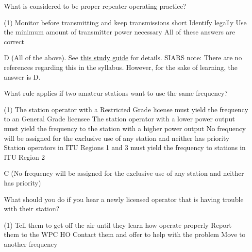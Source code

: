 \documentclass[a4paper]{article}
\begin{document}
\begin{question}What is considered to be proper repeater operating practice?
	\begin{tasks}(1)
		\task Monitor before transmitting and keep transmissions short
		\task Identify legally
		\task Use the minimum amount of transmitter power necessary
		\task All of these answers are correct
	\end{tasks}
\end{question}

\begin{solution}
	D (All of the above). See \href{http://www.smrs.us/classes/he-tech-study.pdf}{this study guide} for details. SIARS note: There are no references regarding this in the syllabus. However, for the sake of learning, the answer is \apostrophe{}D\apostrophe{}.

\end{solution}

\vspace{5mm}



\begin{question}What rule applies if two amateur stations want to use the same frequency?
	\begin{tasks}(1)
		\task The station operator with a Restricted Grade license must yield the frequency to an General Grade licensee
		\task The station operator with a lower power output must yield the frequency to the station with a higher power output
		\task No frequency will be assigned for the exclusive use of any station and neither has priority
		\task Station operators in ITU Regions 1 and 3 must yield the frequency to stations in ITU Region 2
	\end{tasks}
\end{question}

\begin{solution}
	C (No frequency will be assigned for the exclusive use of any station and neither has priority)
\end{solution}

\vspace{5mm}



\begin{question}What should you do if you hear a newly licensed operator that is having trouble with their station?
	\begin{tasks}(1)
		\task Tell them to get off the air until they learn how operate properly
		\task Report them to the WPC HO
		\task Contact them and offer to help with the problem
		\task Move to another frequency
	\end{tasks}
\end{question}
\end{document}
